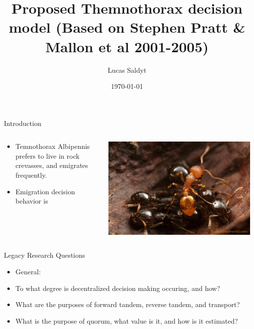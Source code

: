 \documentclass{beamer}
\title{Proposed Themnothorax decision model (Based on Stephen Pratt \& Mallon et al 2001-2005)}
\date{\today}
\author{Lucas Saldyt}
\institute{Arizona State University}
\makeatletter
\def\mcolor#1#{\@mcolor{#1}}
\def\@mcolor#1#2#3{%
  \protect\leavevmode
  \begingroup
    \color#1{#2}#3%
  \endgroup
}
\makeatother
\begin{document}
  \maketitle
  \begin{frame}{Introduction}
      \begin{columns}
          \begin{column}{0.5\textwidth}
              \begin{itemize}
                  \item Temnothorax Albipennis prefers to live in rock crevasses, and emigrates frequently.
                  \item Emigration decision behavior is 
              \end{itemize}
          \end{column}
          \begin{column}{0.5\textwidth}
               \includegraphics[scale=1.0]{americanus}
          \end{column}
      \end{columns}
  \end{frame}
    \begin{frame}{Legacy Research Questions}
       \begin{itemize}
           \item General: 
           \item To what degree is decentralized decision making occuring, and how?
           \item What are the purposes of forward tandem, reverse tandem, and transport?
           \item What is the purpose of quorum, what value is it, and how is it estimated?
       \end{itemize}
   \end{frame}
\end{document}
